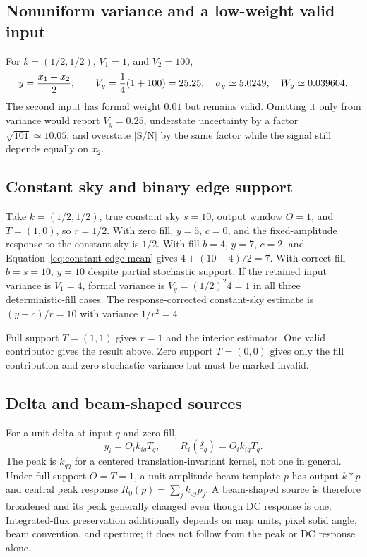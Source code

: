 \documentclass[11pt]{article}
\begin{document}
\subsection{Nonuniform variance and a low-weight valid input}

For $k=(1/2,1/2)$, $V_1=1$, and $V_2=100$,
\begin{equation}
 y={x_1+x_2\over2},\qquad V_y={1\over4}(1+100)=25.25,
 \quad\sigma_y\simeq5.0249,\quad W_y\simeq0.039604.
 \label{eq:case-low-weight}
\end{equation}
The second input has formal weight $0.01$ but remains valid.  Omitting it only
from variance would report $V_y=0.25$, understate uncertainty by a factor
$\sqrt{101}\simeq10.05$, and overstate $|$S/N$|$ by the same factor while the
signal still depends equally on $x_2$.

\subsection{Constant sky and binary edge support}

Take $k=(1/2,1/2)$, true constant sky $s=10$, output window $O=1$, and
$T=(1,0)$, so $r=1/2$.  With zero fill, $y=5$, $c=0$, and the fixed-amplitude
response to the constant sky is $1/2$.  With fill $b=4$, $y=7$, $c=2$, and
Equation~\eqref{eq:constant-edge-mean} gives
$4+(10-4)/2=7$.  With correct fill $b=s=10$, $y=10$ despite partial stochastic
support.  If the retained input variance is $V_1=4$, formal variance is
$V_y=(1/2)^2 4=1$ in all three deterministic-fill cases.  The response-corrected
constant-sky estimate is $(y-c)/r=10$ with variance $1/r^2=4$.

Full support $T=(1,1)$ gives $r=1$ and the interior estimator.  One valid
contributor gives the result above.  Zero support $T=(0,0)$ gives only the fill
contribution and zero stochastic variance but must be marked invalid.

\subsection{Delta and beam-shaped sources}

For a unit delta at input $q$ and zero fill,
\begin{equation}
 y_i=O_i k_{iq}T_q,\qquad R_i(\delta_q)=O_i k_{iq}T_q.
 \label{eq:case-delta}
\end{equation}
The peak is $k_{qq}$ for a centered translation-invariant kernel, not one in
general.  Under full support $O=T=1$, a unit-amplitude beam template $p$ has
output $k*p$ and central peak response
$R_0(p)=\sum_jk_{0j}p_j$.  A beam-shaped source is
therefore broadened and its peak generally changed even though DC response is
one.  Integrated-flux preservation additionally depends on map units, pixel
solid angle, beam convention, and aperture; it does not follow from the peak
or DC response alone.
\end{document}
